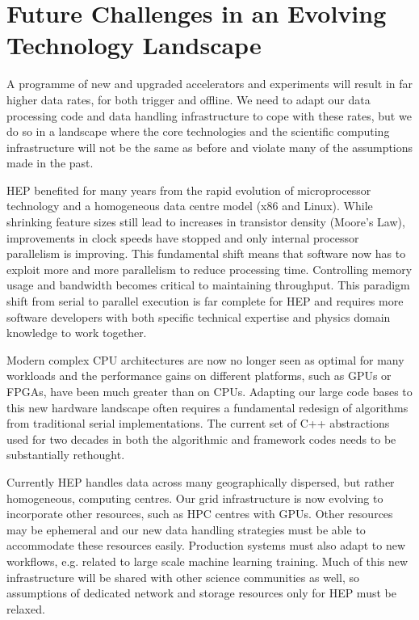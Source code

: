 \documentclass[11pt,a4paper]{article}
\begin{document}
\section*{Future Challenges in an Evolving Technology
Landscape}\label{future-challenges-in-an-evolving-technology-landscape}

A programme of new and upgraded accelerators and experiments will result
in far higher data rates, for both trigger and offline. We need to adapt
our data processing code and data handling infrastructure to cope with
these rates, but we do so in a landscape where the core technologies
and the scientific computing infrastructure will not be the
same as before and violate many of the assumptions made in the past.

HEP benefited for many years from the rapid evolution of microprocessor
technology and a homogeneous data centre model (x86 and Linux). While
shrinking feature sizes still lead to increases in transistor density
(Moore's Law), improvements in clock speeds have stopped and only
internal processor parallelism is improving. This fundamental shift
means that software now has to exploit more and more parallelism to
reduce processing time. Controlling memory usage and bandwidth becomes
critical to maintaining throughput. This paradigm shift from serial to
parallel execution is far complete for HEP and requires more software
developers with both specific technical expertise and physics domain
knowledge to work together.

Modern complex CPU architectures are now no longer seen as optimal for many
workloads and the performance gains on different platforms, such as GPUs or
FPGAs, have been much greater than on CPUs. Adapting our large code bases to
this new hardware landscape often requires a fundamental redesign of algorithms
from traditional serial implementations. The current set of C++ abstractions
used for two decades in both the algorithmic and framework codes needs to be
substantially rethought.

Currently HEP handles data across many geographically dispersed, but
rather homogeneous, computing centres. Our grid infrastructure is now
evolving to incorporate other resources, such as HPC centres with GPUs.
Other resources may be ephemeral and
our new data handling strategies must be able to accommodate these
resources easily. Production systems must also adapt to new workflows,
e.g. related to large scale machine learning training. Much of this new
infrastructure will be shared with other science communities as well, so
assumptions of dedicated network and storage resources only for HEP must
be relaxed.
\end{document}
